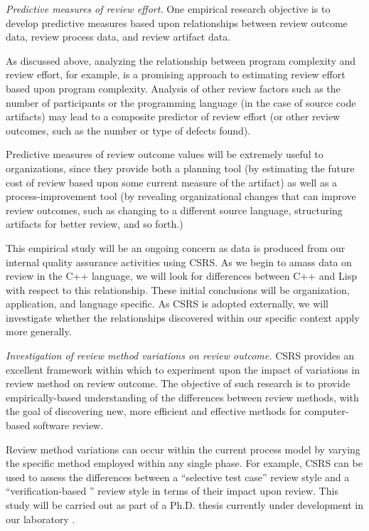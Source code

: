 \begin{itemizenoindent}
  
\item {\em Predictive measures of review effort.} One empirical research
  objective is to develop predictive measures based upon relationships
  between review outcome data, review process data, and review artifact data.
  
  As discussed above, analyzing the relationship between program
  complexity and review effort, for example, is a promising approach to
  estimating review effort based upon program complexity.  Analysis of
  other review factors such as the number of participants or the
  programming language (in the case of source code artifacts) may lead to
  a composite predictor of review effort (or other review outcomes, such
  as the number or type of defects found).
  
  Predictive measures of review outcome values will be extremely useful
  to organizations, since they provide both a planning tool (by
  estimating the future cost of review based upon some current measure of
  the artifact) as well as a process-improvement tool (by revealing
  organizational changes that can improve review outcomes, such as
  changing to a different source language, structuring artifacts for
  better review, and so forth.)
  
  This empirical study will be an ongoing concern as data is produced
  from our internal quality assurance activities using CSRS.  As we begin
  to amass data on review in the C++ language, we will look for
  differences between C++ and Lisp with respect to this relationship.
  These initial conclusions will be organization, application, and
  language specific.  As CSRS is adopted externally, we will investigate
  whether the relationships discovered within our specific context apply
  more generally. 

  
\item {\em Investigation of review method variations on review outcome.}
  CSRS provides an excellent framework within which to experiment upon the
  impact of variations in review method on review outcome.  The objective
  of such research is to provide empirically-based understanding of the
  differences between review methods, with the goal of discovering new,
  more efficient and effective methods for computer-based software review.
  
  Review method variations can occur within the current process model by
  varying the specific method employed within any single phase.  For
  example, CSRS can be used to assess the differences between a
  ``selective test case'' review style and a ``verification-based ''
  review style in terms of their impact upon review.  This study will be
  carried out as part of a Ph.D.  thesis currently under development in
  our laboratory \cite{csdl-ro-93-05}.
  

\end{itemizenoindent}
